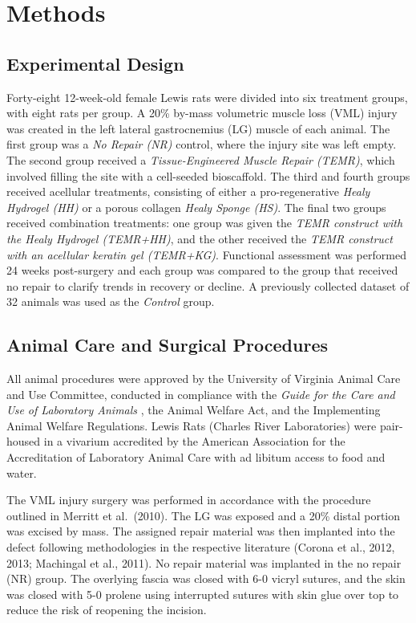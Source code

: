 \documentclass[
]{agujournal2019}
\begin{document}
\section{Methods}\label{methods}

\subsection{Experimental Design}\label{experimental-design}

Forty-eight 12-week-old female Lewis rats were divided into six
treatment groups, with eight rats per group. A 20\% by-mass volumetric
muscle loss (VML) injury was created in the left lateral gastrocnemius
(LG) muscle of each animal. The first group was a \emph{No Repair (NR)}
control, where the injury site was left empty. The second group received
a \emph{Tissue-Engineered Muscle Repair (TEMR)}, which involved filling
the site with a cell-seeded bioscaffold. The third and fourth groups
received acellular treatments, consisting of either a pro-regenerative
\emph{Healy Hydrogel (HH)} or a porous collagen \emph{Healy Sponge
(HS)}. The final two groups received combination treatments: one group
was given the \emph{TEMR construct with the Healy Hydrogel (TEMR+HH)},
and the other received the \emph{TEMR construct with an acellular
keratin gel (TEMR+KG)}. Functional assessment was performed 24 weeks
post-surgery and each group was compared to the group that received no
repair to clarify trends in recovery or decline. A previously collected
dataset of 32 animals was used as the \emph{Control} group.

\subsection{Animal Care and Surgical
Procedures}\label{animal-care-and-surgical-procedures}

All animal procedures were approved by the University of Virginia Animal
Care and Use Committee, conducted in compliance with the \emph{Guide for
the Care and Use of Laboratory Animals} , the Animal Welfare Act, and
the Implementing Animal Welfare Regulations. Lewis Rats (Charles River
Laboratories) were pair-housed in a vivarium accredited by the American
Association for the Accreditation of Laboratory Animal Care with ad
libitum access to food and water.

The VML injury surgery was performed in accordance with the procedure
outlined in Merritt et al.~(2010). The LG was exposed and a 20\% distal
portion was excised by mass. The assigned repair material was then
implanted into the defect following methodologies in the respective
literature (Corona et al., 2012, 2013; Machingal et al., 2011). No
repair material was implanted in the no repair (NR) group. The overlying
fascia was closed with 6-0 vicryl sutures, and the skin was closed with
5-0 prolene using interrupted sutures with skin glue over top to reduce
the risk of reopening the incision.
\end{document}
